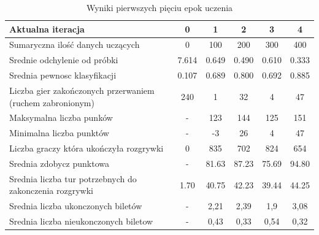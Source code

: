 \documentclass[12pt, oneside]{report}
\begin{document}
\begin{table}[h]
	\begin{center}
		\begin{tabular}{| p{6cm} | c | c | c | c | c |} \hline
			Aktualna iteracja & 0 & 1 & 2 & 3 & 4 \\ \hline
			Sumaryczna ilość danych uczących & 0 & 100 & 200 & 300 & 400 \\ \hline
			Srednie odchylenie od próbki & 7.614 & 0.649 & 0.490 & 0.610 & 0.333 \\ \hline
			Srednia pewnosc klasyfikacji & 0.107 & 0.689 & 0.800 & 0.692 & 0.885 \\ \hline
			Liczba gier zakończonych przerwaniem (ruchem zabronionym) & 240 & 1 & 32 & 4 & 47 \\ \hline
			Maksymalna liczba punków & - & 123 & 144 & 125 & 151 \\ \hline
			Minimalna liczba punktów & - & -3 & 26 & 4 & 47 \\ \hline
			Liczba graczy która ukończyła rozgrywki & 0 & 835 & 702 & 824 & 654 \\ \hline
			Srednia zdobycz punktowa & - & 81.63 & 87.23 & 75.69 & 94.80 \\ \hline
			Srednia liczba tur potrzebnych do zakonczenia rozgrywki & 1.70 & 40.75 & 42.23 & 39.44 & 44.25 \\ \hline
			Srednia liczba ukonczonych biletów & - & 2,21 & 2,39 & 1,9 & 3,08 \\ \hline
			Srednia liczba nieukonczonych biletow & - & 0,43 & 0,33 & 0,54 & 0,32 \\ \hline
		\end{tabular}	
		\caption{Wyniki pierwszych pięciu epok uczenia}
		\label{table:learn_metrics}
	\end{center}
\end{table}
\end{document}

